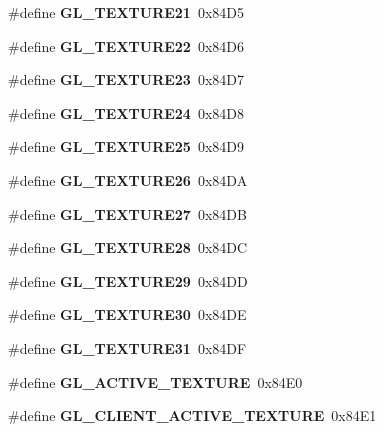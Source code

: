 \begin{DoxyCompactItemize}
\item 
\#define {\bfseries G\+L\+\_\+\+T\+E\+X\+T\+U\+R\+E21}~0x84\+D5\label{_s_d_l__opengl_8h_ad3cc84e18c6e199a24ab0ca59741f13e}

\item 
\#define {\bfseries G\+L\+\_\+\+T\+E\+X\+T\+U\+R\+E22}~0x84\+D6\label{_s_d_l__opengl_8h_ad7bb0cc4784c49d1eb83c8d09e06c9c0}

\item 
\#define {\bfseries G\+L\+\_\+\+T\+E\+X\+T\+U\+R\+E23}~0x84\+D7\label{_s_d_l__opengl_8h_a8e98a806da366c64ec10765b122ecf1d}

\item 
\#define {\bfseries G\+L\+\_\+\+T\+E\+X\+T\+U\+R\+E24}~0x84\+D8\label{_s_d_l__opengl_8h_a3ad5b3e82f51885b0ebc604e54b624f0}

\item 
\#define {\bfseries G\+L\+\_\+\+T\+E\+X\+T\+U\+R\+E25}~0x84\+D9\label{_s_d_l__opengl_8h_affa8df39d0f4c718934bc194a118babb}

\item 
\#define {\bfseries G\+L\+\_\+\+T\+E\+X\+T\+U\+R\+E26}~0x84\+D\+A\label{_s_d_l__opengl_8h_a7097b44e05a237ba70bd11ba1ead56b8}

\item 
\#define {\bfseries G\+L\+\_\+\+T\+E\+X\+T\+U\+R\+E27}~0x84\+D\+B\label{_s_d_l__opengl_8h_a3cc96950e9132633e9f7b7610c990d53}

\item 
\#define {\bfseries G\+L\+\_\+\+T\+E\+X\+T\+U\+R\+E28}~0x84\+D\+C\label{_s_d_l__opengl_8h_a07ec904516d5981c54dc4ffb9654a86f}

\item 
\#define {\bfseries G\+L\+\_\+\+T\+E\+X\+T\+U\+R\+E29}~0x84\+D\+D\label{_s_d_l__opengl_8h_a4ac3541defe5f96fa06dd57f0a8891b2}

\item 
\#define {\bfseries G\+L\+\_\+\+T\+E\+X\+T\+U\+R\+E30}~0x84\+D\+E\label{_s_d_l__opengl_8h_a78da9f28544559f2bfccf8a9d43a406e}

\item 
\#define {\bfseries G\+L\+\_\+\+T\+E\+X\+T\+U\+R\+E31}~0x84\+D\+F\label{_s_d_l__opengl_8h_adbb8b4ec84d0ddb49ebc9c2290c8be20}

\item 
\#define {\bfseries G\+L\+\_\+\+A\+C\+T\+I\+V\+E\+\_\+\+T\+E\+X\+T\+U\+R\+E}~0x84\+E0\label{_s_d_l__opengl_8h_a6fc1b36f39e5859ac72ebfaf3722a0c1}

\item 
\#define {\bfseries G\+L\+\_\+\+C\+L\+I\+E\+N\+T\+\_\+\+A\+C\+T\+I\+V\+E\+\_\+\+T\+E\+X\+T\+U\+R\+E}~0x84\+E1\label{_s_d_l__opengl_8h_af63f4282cc56a189eb80eae77d67b3e0}


\end{DoxyCompactItemize}

